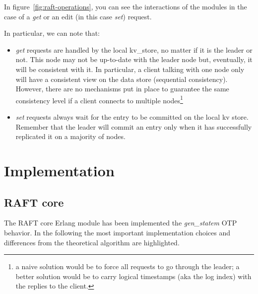 \documentclass[a4paper]{article}
\begin{document}
In figure~\ref{fig:raft-operations}, you can see the interactions of the modules
in the case of a \emph{get} or an edit (in this case \emph{set}) request.

In particular, we can note that:
\begin{itemize}
    \item \emph{get} requests are handled by the local kv\_store, no matter if 
        it is the leader or not. This node may not be up-to-date with the 
        leader node but, eventually, it will be consistent with it. In 
        particular, a client talking with one node only will have a 
        consistent view on the data store (sequential consistency). However,
        there are no mechanisms put in place to guarantee the same consistency
        level if a client connects to multiple nodes\footnote{a naive solution 
        would be to force all requests to go through the leader; a better 
        solution would be to carry logical timestamps (aka the log index) 
        with the replies to the client.}
    \item \emph{set} requests always wait for the entry to be committed on the 
        local kv store. Remember that the leader will commit an entry only
        when it has successfully replicated it on a majority of nodes.
\end{itemize}


\section{Implementation}

\subsection{RAFT core}
The RAFT core Erlang module has been implemented the \emph{gen\_statem} OTP
behavior. In the following the most important implementation choices and 
differences from the theoretical algorithm are highlighted.
\end{document}
